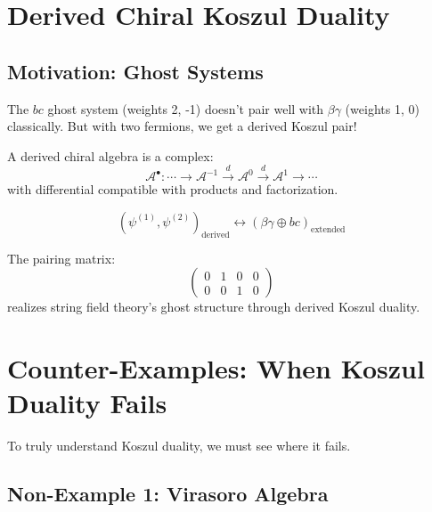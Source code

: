 
\section{Derived Chiral Koszul Duality}

\subsection{Motivation: Ghost Systems}

The $bc$ ghost system (weights 2, -1) doesn't pair well with $\beta\gamma$ (weights 1, 0) classically. But with two fermions, we get a derived Koszul pair!

\begin{definition}
A derived chiral algebra is a complex:
$$\mathcal{A}^{\bullet}: \cdots \to \mathcal{A}^{-1} \xrightarrow{d} \mathcal{A}^0 \xrightarrow{d} \mathcal{A}^1 \to \cdots$$
with differential compatible with products and factorization.
\end{definition}

\begin{theorem}
$$(\psi^{(1)}, \psi^{(2)})_{\text{derived}} \leftrightarrow (\beta\gamma \oplus bc)_{\text{extended}}$$

The pairing matrix:
$$\begin{pmatrix}
0 & 1 & 0 & 0 \\
0 & 0 & 1 & 0
\end{pmatrix}$$
realizes string field theory's ghost structure through derived Koszul duality.
\end{theorem}


\section{Counter-Examples: When Koszul Duality Fails}
\label{sec:counter-examples}

To truly understand Koszul duality, we must see where it fails.

\subsection{Non-Example 1: Virasoro Algebra}
\label{subsec:virasoro-non-example}

